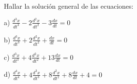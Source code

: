 \epro

\bpro
Hallar la soluci\'on general de las ecuaciones:

a) $\frac{d^3 x}{dt^3} - 2\frac{d^2 x}{dt^2} - 3\frac{d x}{dt} =0$

b) $\frac{d^3 x}{dt^3} + 2\frac{d^2 x}{dt^2} + \frac{d x}{dt} =0$

c) $\frac{d^3 x}{dt^3} + 4\frac{d^2 x}{dt^2} + 13 \frac{d x}{dt} =0$

d) $\frac{d^4 x}{dt^4} + 4\frac{d^3 x}{dt^3} + 8\frac{d^2 x}{dt^2} + 8 \frac{d x}{dt} + 4 = 0$
\epro


